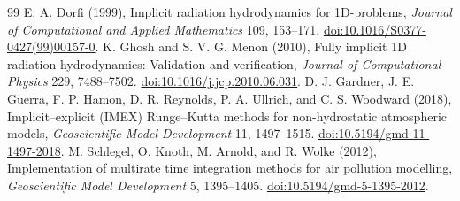 \documentclass[english,a4paper]{my_memo}
\begin{document}
\begin{thebibliography}{99}
 E. A. Dorfi (1999), Implicit radiation hydrodynamics for 1D-problems, \emph{Journal of Computational and Applied Mathematics} 109, 153--171. \href{https://doi.org/10.1016/S0377-0427(99)00157-0}{doi:10.1016/S0377-0427(99)00157-0}.
 K. Ghosh and S. V. G. Menon (2010), Fully implicit 1D radiation hydrodynamics: Validation and verification, \emph{Journal of Computational Physics} 229, 7488--7502. \href{https://doi.org/10.1016/j.jcp.2010.06.031}{doi:10.1016/j.jcp.2010.06.031}.
 D. J. Gardner, J. E. Guerra, F. P. Hamon, D. R. Reynolds, P. A. Ullrich, and C. S. Woodward (2018), Implicit--explicit (IMEX) Runge--Kutta methods for non-hydrostatic atmospheric models, \emph{Geoscientific Model Development} 11, 1497--1515. \href{https://doi.org/10.5194/gmd-11-1497-2018}{doi:10.5194/gmd-11-1497-2018}.
 M. Schlegel, O. Knoth, M. Arnold, and R. Wolke (2012), Implementation of multirate time integration methods for air pollution modelling, \emph{Geoscientific Model Development} 5, 1395--1405. \href{https://doi.org/10.5194/gmd-5-1395-2012}{doi:10.5194/gmd-5-1395-2012}.


\end{thebibliography}
\end{document}
